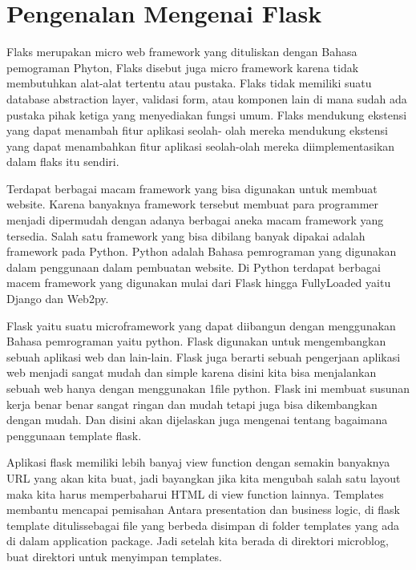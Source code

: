
\section {Pengenalan Mengenai Flask}
Flaks merupakan micro web framework yang dituliskan dengan Bahasa pemograman Phyton, Flaks disebut juga micro framework karena tidak 
membutuhkan alat-alat tertentu atau pustaka. Flaks tidak memiliki suatu database abstraction layer, validasi form, atau komponen lain di 
mana sudah ada pustaka pihak ketiga yang menyediakan fungsi umum. Flaks mendukung ekstensi yang dapat menambah fitur aplikasi seolah-
olah mereka mendukung ekstensi yang dapat menambahkan fitur aplikasi seolah-olah mereka diimplementasikan dalam flaks itu sendiri.

Terdapat berbagai macam framework yang bisa digunakan untuk membuat website. Karena banyaknya framework tersebut membuat para programmer 
menjadi dipermudah dengan adanya berbagai aneka macam framework yang tersedia. Salah satu framework yang bisa dibilang banyak dipakai 
adalah framework pada Python. Python adalah Bahasa pemrograman yang digunakan dalam penggunaan dalam pembuatan website. Di Python 
terdapat berbagai macem framework yang digunakan mulai dari Flask hingga FullyLoaded yaitu Django dan Web2py.

Flask yaitu suatu microframework yang dapat diibangun dengan menggunakan Bahasa pemrograman yaitu python. Flask digunakan untuk 
mengembangkan sebuah aplikasi web dan lain-lain. Flask juga berarti sebuah pengerjaan aplikasi web menjadi sangat mudah dan simple 
karena disini kita bisa menjalankan sebuah web hanya dengan menggunakan 1file python. Flask ini membuat susunan kerja benar benar sangat 
ringan dan mudah tetapi juga bisa dikembangkan dengan mudah.  Dan disini akan dijelaskan juga mengenai tentang bagaimana penggunaan 
template flask.

Aplikasi flask memiliki lebih banyaj view function dengan semakin banyaknya URL yang akan kita buat, jadi bayangkan jika kita mengubah 
salah satu layout maka kita harus memperbaharui HTML di view function lainnya.  Templates membantu mencapai pemisahan Antara presentation 
dan business logic, di flask template ditulissebagai file yang berbeda disimpan di folder templates yang ada di dalam application package. 
Jadi setelah kita berada di direktori microblog, buat direktori untuk menyimpan templates. 

